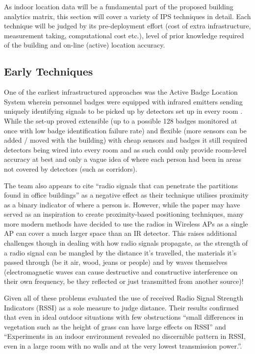 \documentclass{UoYCSproject}
\begin{document}
            As indoor location data will be a fundamental part of the proposed building analytics matrix, this section will cover a variety of IPS techniques in detail. Each technique will be judged by its pre-deployment effort (cost of extra infrastructure, measurement taking, computational cost etc.), level of prior knowledge required of the building and on-line (active) location accuracy.
            
            \subsection{Early Techniques}
            \label{sec:early}
            
                One of the earliest infrastructured approaches was the Active Badge Location System wherein personnel badges were equipped with infrared emitters sending uniquely identifying signals to be picked up by detectors set up in every room \citep{want1992active}. While the set-up proved extensible (up to a possible 128 badges monitored at once with low badge identification failure rate) and flexible (more sensors can be added / moved with the building) with cheap sensors and badges it still required detectors being wired into every room and as such could only provide room-level accuracy at best and only a vague idea of where each person had been in areas not covered by detectors (such as corridors). 
            
                The team also appears to cite ``radio signals that can penetrate the partitions found in office buildings'' as a negative effect as their technique utilises proximity as a binary indicator of where a person is. However, while the paper may have served as an inspiration to create proximity-based positioning techniques, many more modern methods have decided to use the radios in Wireless APs as a single AP can cover a much larger space than an IR detector. This raises additional challenges though in dealing with how radio signals propagate, as the strength of a radio signal can be mangled by the distance it's travelled,  the materials it's passed through (be it air, wood, jeans or people) and by waves themselves (electromagnetic waves can cause destructive and constructive interference on their own frequency, be they reflected or just transmitted from another source)!
                
                Given all of these problems \citet{whitehouse2007practical} evaluated the use of received Radio Signal Strength Indicators (RSSI) as a sole measure to judge distance. Their results confirmed that even in ideal outdoor situations with few obstructions ``small differences in vegetation such as the height of grass can have large effects on RSSI'' and ``Experiments in an indoor environment revealed no discernible pattern in RSSI, even in a large room with no walls and at the very lowest transmission power.''.
            
\end{document}

